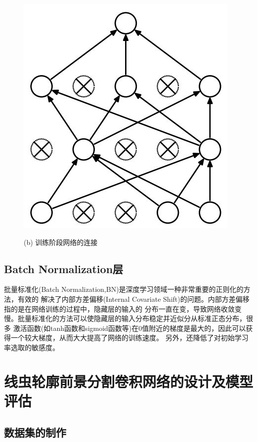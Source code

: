 \begin{figure}[!htp]
\begin{minipage}[t]{0.5\linewidth}
	\includegraphics[width=0.9\linewidth]{figure/chap4/dropout.jpg}    
	\caption*{(b) 训练阶段网络的连接}
	\label{fig:dropout}
\end{minipage}
\label{fig:dropout-connection}
\end{figure}

\subsection{Batch Normalization层}
	批量标准化(Batch Normalization,BN)是深度学习领域一种非常重要的正则化的方法\cite{ioffe2015batch}，有效的
	解决了内部方差偏移(Internal Covariate Shift)的问题。内部方差偏移指的是在网络训练的过程中，隐藏层的输入的
	分布一直在变，导致网络收敛变慢。批量标准化的方法可以使隐藏层的输入分布稳定并近似分从标准正态分布，很多
	激活函数(如tanh函数和sigmoid函数等)在0值附近的梯度是最大的，因此可以获得一个较大梯度，从而大大提高了网络的训练速度。
	另外，还降低了对初始学习率选取的敏感度。
\section{线虫轮廓前景分割卷积网络的设计及模型评估}

\subsection{数据集的制作}
